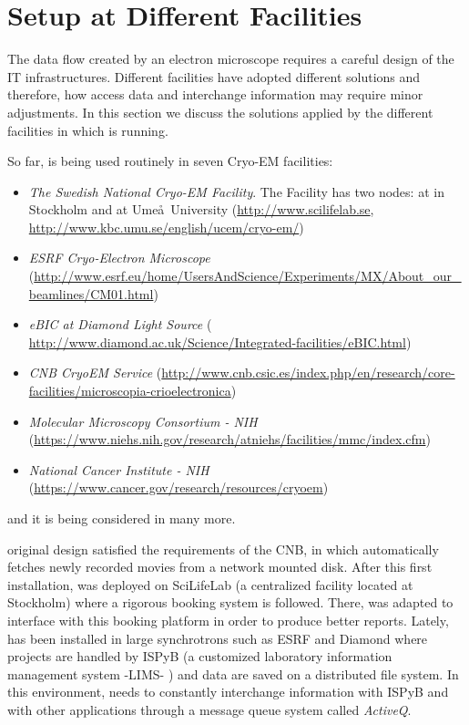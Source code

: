 \section{\scipion Setup at Different Facilities}

The data flow created by an electron microscope requires a careful design of the IT infrastructures.  Different facilities have adopted different solutions and therefore, how \scipion  access data and interchange information may require minor adjustments. In this section we discuss  the  solutions applied by the different facilities in which \scipion is running.

So far, \scipion is being used routinely in seven Cryo-EM facilities:
\begin{itemize}
 \itemsep0em 

 \item \emph{The Swedish National Cryo-EM Facility}. The Facility has two nodes: at \scilifelab in Stockholm and at Ume\aa\ University (\url{http://www.scilifelab.se}, \url{http://www.kbc.umu.se/english/ucem/cryo-em/})
 \item \emph{ESRF Cryo-Electron Microscope} (\url{http://www.esrf.eu/home/UsersAndScience/Experiments/MX/About_our_beamlines/CM01.html})
 \item \emph{eBIC at Diamond Light Source} ( \url{http://www.diamond.ac.uk/Science/Integrated-facilities/eBIC.html})
 \item \emph{CNB CryoEM Service} (\url{http://www.cnb.csic.es/index.php/en/research/core-facilities/microscopia-crioelectronica})
 \item \emph{Molecular Microscopy Consortium - NIH} (\url{https://www.niehs.nih.gov/research/atniehs/facilities/mmc/index.cfm})
 \item \emph{National Cancer Institute - NIH} (\url{https://www.cancer.gov/research/resources/cryoem})
 
\end{itemize}
and it is being considered in many more.

\scipion original design satisfied the requirements of the CNB, in which \scipion automatically fetches newly recorded movies from a network mounted disk. After this first installation, \scipion was deployed on SciLifeLab (a centralized facility located at Stockholm) where a rigorous booking system is followed. There, \scipion was adapted to interface with this booking platform in order to produce better reports. Lately,  \scipion has been installed in  large synchrotrons  such as ESRF and Diamond  where projects are handled by ISPyB (a customized laboratory information management system -LIMS- \citep{Delageniere2011:ispb}) and data are saved on a distributed file system. %
In this environment, \scipion needs to constantly interchange information with ISPyB and with other applications through a message queue system called \emph{ActiveQ}.%

